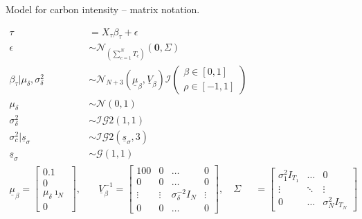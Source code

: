\documentclass[notes,blackandwhite,mathsans,usenames,dvipsnames]{beamer}
\begin{document}
\begin{frame}{Model for carbon intensity -- matrix notation.}

\small
\begin{align*}
\tau &= X_\tau \beta_\tau + \epsilon\\
\epsilon &\sim\mathcal{N}_{(\sum_{c=1}^NT_c)}\left(\mathbf{0},\Sigma  \right)\\[2ex]
\beta_\tau|\mu_\delta,\sigma_\delta^2 &\sim\mathcal{N}_{N+3}\left(\underline{\mu}_\beta, \underline{V}_\beta\right)\mathcal{I}\left(\begin{array}{c} \beta\in[0,1]\\ \rho\in[-1,1] \end{array}\right)\\
\mu_\delta&\sim\mathcal{N}(0,1)\\
\sigma_\delta^2&\sim\mathcal{IG}2(1,1)\\[1ex]
\sigma_c^2|\underline{s}_\sigma&\sim\mathcal{IG}2(\underline{s}_\sigma,3)\\
\underline{s}_\sigma&\sim\mathcal{G}(1,1)\\[2ex]
\underline{\mu}_\beta=\begin{bmatrix}0.1\\0\\ \mu_\delta\imath_N \\0\end{bmatrix},&\quad
\underline{V}_\beta^{-1}=\begin{bmatrix}
100 &0&\dots &0\\
0&0&\dots&0\\
\vdots&\vdots&\sigma_\delta^{-2}I_N&\vdots\\
0&0&\dots&0
\end{bmatrix},\quad
\Sigma&=\begin{bmatrix}
\sigma^2_1I_{T_1}&\dots&0\\
\vdots&\ddots&\vdots\\
0&\dots&\sigma^2_NI_{T_N}
\end{bmatrix}
\end{align*}

\end{frame}
\end{document}
